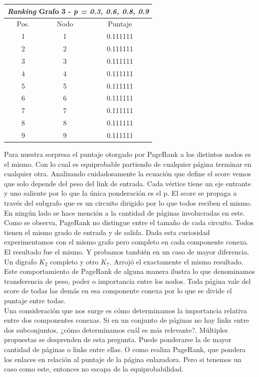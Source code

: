 \begin{center}
         \begin{tabular}{|c|c|c|}
                    \hline
                    \multicolumn{3}{|c||}{\emph{Ranking} Grafo 3 - \emph{p = 0.3, 0.6, 0.8, 0.9}} \\ \hline
Pos. & Nodo & Puntaje \\ \hline
1 & 1 & 0.111111 \\ 
2 & 2 & 0.111111 \\
3 & 3 & 0.111111 \\
4 & 4 & 0.111111 \\
5 & 5 & 0.111111  \\
6 & 6 & 0.111111  \\
7 & 7 & 0.111111   \\
8 & 8 & 0.111111 \\
9 & 9 & 0.111111  \\
 \hline

                \end{tabular}
            \end{center}
 
Para nuestra sorpresa el puntaje otorgado por PageRank a los distintos nodos es el mismo. Con lo cual es equiprobable partiendo de cualquier página terminar en cualquier otra. Analizando cuidadosamente la ecuación que define el score vemos que solo depende del peso del link de entrada. Cada vértice tiene un eje entrante y uno saliente por lo que la única ponderación es el p. El score se propaga a través del subgrafo que es un circuito dirigido por lo que todos reciben el mismo. En ningún lado se hace mención a la cantidad de páginas involucradas en este. \\

Como se observa, PageRank no distingue entre el tamaño de cada circuito. Todos tienen el mismo grado de entrada y de salida. Dada esta curiosidad experimentamos con el mismo grafo pero completo en cada componente conexa. El resultado fue el mismo. Y probamos también en un caso de mayor diferencia. Un digrafo $K_{2}$ completo y otro $K_{7}$. Arrojó el exactamente el mismo resultado. \\

Este comportamiento de PageRank de alguna manera ilustra lo que denominamos transferencia de peso, poder o importancia entre los nodos. Toda página vale del score de todas las demás en esa componente conexa por lo que se divide el puntaje entre todas. \\

Una consideración que nos surge es cómo determinamos la importancia relativa entre dos componentes conexas. Si en un conjunto de páginas no hay links entre dos subconjuntos, ¿cómo determinamos cuál es más relevante?. Múltiples propuestas se desprenden de esta pregunta. Puede ponderarse la de mayor cantidad de páginas o links entre ellas. O como realiza PageRank, que pondera los enlaces en relación al puntaje de la página enlazadora. Pero si tenemos un caso como este,
entonces no escapa de la equiprobabilidad.\\


